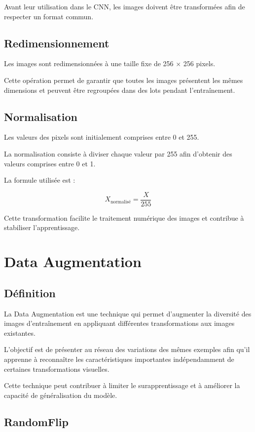 \documentclass[12pt,a4paper,oneside]{report}
\begin{document}
Avant leur utilisation dans le CNN, les images doivent
être transformées afin de respecter un format commun.

\subsection{Redimensionnement}

Les images sont redimensionnées à une taille fixe
de 256 $\times$ 256 pixels.

Cette opération permet de garantir que toutes les images
présentent les mêmes dimensions et peuvent être regroupées
dans des lots pendant l'entraînement.

\subsection{Normalisation}

Les valeurs des pixels sont initialement comprises
entre 0 et 255.

La normalisation consiste à diviser chaque valeur
par 255 afin d'obtenir des valeurs comprises entre
0 et 1.

La formule utilisée est :

\[
X_{\text{normalisé}} = \frac{X}{255}
\]

Cette transformation facilite le traitement numérique
des images et contribue à stabiliser l'apprentissage.

\section{Data Augmentation}

\subsection{Définition}

La Data Augmentation est une technique qui permet
d'augmenter la diversité des images d'entraînement
en appliquant différentes transformations aux images
existantes.

L'objectif est de présenter au réseau des variations
des mêmes exemples afin qu'il apprenne à reconnaître
les caractéristiques importantes indépendamment
de certaines transformations visuelles.

Cette technique peut contribuer à limiter le surapprentissage
et à améliorer la capacité de généralisation du modèle.

\subsection{RandomFlip}
\end{document}
